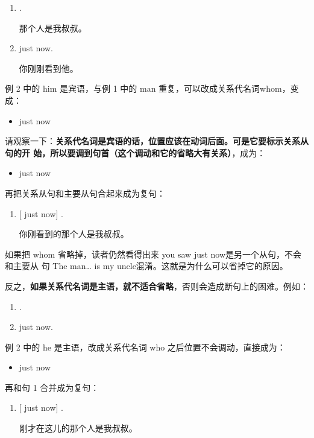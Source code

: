 \begin{enumerate}
\item {}  .

  那个人是我叔叔。
\item {}   just now.

  你刚刚看到他。
\end{enumerate}

例 2 中的 him 是宾语，与例 1 中的 man 重复，可以改成关系代名词whom，变成：
\begin{itemize}
\item {}   just now
\end{itemize}

请观察一下：\textbf{关系代名词是宾语的话，位置应该在动词后面。可是它要标示关系从句的开
  始，所以要调到句首（这个调动和它的省略大有关系）}，成为：
\begin{itemize}
\item {}   just now
\end{itemize}

再把关系从句和主要从句合起来成为复句：
\begin{enumerate}[resume]
\item {} [   just now]  .

  你刚看到的那个人是我叔叔。
\end{enumerate}

如果把 whom 省略掉，读者仍然看得出来 you saw just now是另一个从句，不会和主要从
句 The man\ldots{} is my uncle混淆。这就是为什么可以省掉它的原因。

反之，\textbf{如果关系代名词是主语，就不适合省略}，否则会造成断句上的困难。例如：

\begin{enumerate}
\item {}  .
\item {}   just now.
\end{enumerate}

例 2 中的 he 是主语，改成关系代名词 who 之后位置不会调动，直接成为：
\begin{itemize}
\item {}   just now
\end{itemize}

再和句 1 合并成为复句：
\begin{enumerate}[resume]
\item {} [   just
  now]  .

  刚才在这儿的那个人是我叔叔。
\end{enumerate}

